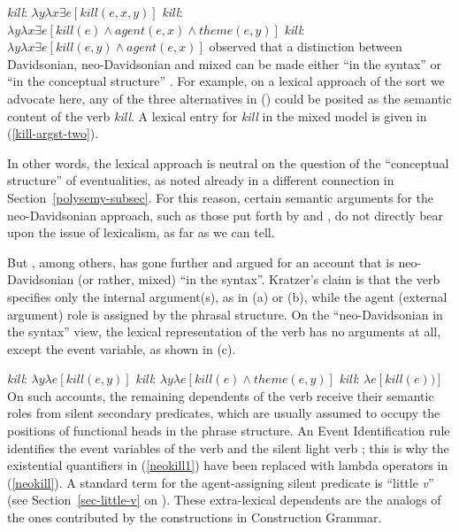 \eal\settowidth{} \label{neokill1}
\ex \emph{kill}: $\lambda y\lambda x\exists e[kill(e, x, y)]$  
\ex \emph{kill}: $\lambda y\lambda x\exists e[kill(e) \wedge agent(e, x) \wedge theme(e, y)]$ 
\ex \emph{kill}: $\lambda y\lambda x\exists e[kill(e,y) \wedge agent(e, x)]$ 
\zl
\citet{Kratzer96a} observed that a distinction between Davidsonian, neo-Davidsonian and mixed can be
made either ``in the syntax'' or ``in the conceptual structure'' \citep[--111]{Kratzer96a}.  For
example, on a lexical approach of the sort we advocate here, any of the three alternatives in
() could be posited as the semantic content of the verb \emph{kill}.  A lexical entry for
\emph{kill} in the mixed model is given in (\ref{kill-argst-two}). 

\ea\label{kill-argst-two}
\z
In other words, the lexical approach is neutral on the question of the ``conceptual structure'' of eventualities, as noted already in a different connection in 
Section~\ref{polysemy-subsec}.  For this reason, certain semantic arguments for the neo-Davidsonian approach, such as those put forth by  \citet[Chapter~4]{Schein93a-u} 
and \citet{Lohndal2012a}, do not directly bear upon the issue of lexicalism, as far as we can tell.  

\addlines[2]
But \citet{Kratzer96a}, among others, has gone further and argued for an account that is neo-Davidsonian (or rather, mixed) ``in the syntax''.  
Kratzer's claim is that the verb specifies only the internal argument(s), as in (a) or (b), while the agent (external argument) role is assigned by the phrasal structure.  
On the ``neo-Davidsonian in the syntax'' view, the lexical representation of the verb has no arguments at all, except the event variable, as shown in (c).

\eal
\label{neokill}\settowidth{}
\ex \emph{kill}: $\lambda y\lambda e[kill(e, y)]$                         
\ex \emph{kill}: $\lambda y\lambda e[kill(e) \wedge theme(e, y)]$ 
\ex \emph{kill}: $\lambda e[kill(e))]$                                  
\zl
On such accounts, the remaining dependents of the verb receive their semantic roles from silent secondary predicates,
which are usually assumed to occupy the positions of functional heads in the phrase structure.  An
Event Identification rule identifies the event variables of the verb and the silent light verb
\citep[]{Kratzer96a}; this is why the existential quantifiers in (\ref{neokill1}) have been
replaced with lambda operators in  (\ref{neokill}).  A standard term for the agent-assigning silent
predicate is ``little \emph{v}'' (see
Section~\ref{sec-little-v} on \littlev).  These extra-lexical dependents are the analogs of the ones
contributed by the constructions in Construction Grammar.   

